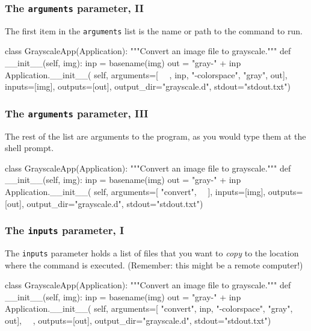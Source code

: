 \documentclass[english,serif,mathserif,xcolor=pdftex,dvipsnames,table]{beamer}
\begin{document}
\begin{frame}[fragile]
\frametitle{The \texttt{arguments} parameter, II}

The first item in the \texttt{arguments} list is the name or path to the command to run.

  \+
\begin{python}
class GrayscaleApp(Application):
  """Convert an image file to grayscale."""
  def __init__(self, img):
    inp = basename(img)
    out = "gray-" + inp
    Application.__init__(
      self,
      arguments=[
        ~~, inp, "-colorspace", "gray", out],
      inputs=[img],
      outputs=[out],
      output_dir="grayscale.d",
      stdout="stdout.txt")
\end{python}
\end{frame}

\begin{frame}[fragile]
\frametitle{The \texttt{arguments} parameter, III}

The rest of the list are arguments to the program, as you would type
them at the shell prompt.

  \+
\begin{python}
class GrayscaleApp(Application):
  """Convert an image file to grayscale."""
  def __init__(self, img):
    inp = basename(img)
    out = "gray-" + inp
    Application.__init__(
      self,
      arguments=[
        "convert", ~~],
      inputs=[img],
      outputs=[out],
      output_dir="grayscale.d",
      stdout="stdout.txt")
\end{python}
\end{frame}


\begin{frame}[fragile]
\frametitle{The \texttt{inputs} parameter, I}

The \texttt{inputs} parameter holds a list of files that you want to
\emph{copy} to the location where the command is executed. (Remember:
this might be a remote computer!)

  \+
\begin{python}
class GrayscaleApp(Application):
  """Convert an image file to grayscale."""
  def __init__(self, img):
    inp = basename(img)
    out = "gray-" + inp
    Application.__init__(
      self,
      arguments=[
        "convert", inp, "-colorspace", "gray", out],
      ~~,
      outputs=[out],
      output_dir="grayscale.d",
      stdout="stdout.txt")
\end{python}
\end{frame}
\end{document}
